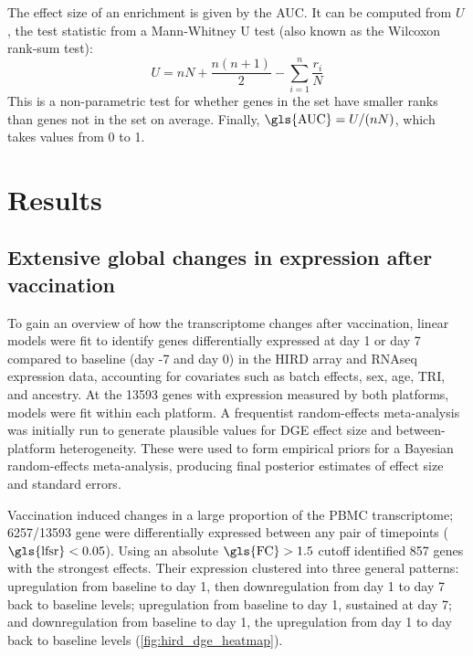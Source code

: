The effect size of an enrichment is given by the \gls{AUC}.
It can be computed from $U$, the test statistic from a Mann-Whitney U test (also known as the Wilcoxon rank-sum test):
\begin{equation}
    U = nN + \frac{n(n + 1)}{2} - \sum_{i=1}^{n} \frac{r_i}{N}
\end{equation}
This is a non-parametric test for whether genes in the set have smaller ranks than genes not in the set on average.
Finally, $\text{\gls{AUC}} = U/(nN)$, which takes values from 0 to 1.

\section{Results}

\subsection{Extensive global changes in expression after vaccination}

To gain an overview of how the transcriptome changes after vaccination, linear models were fit to identify genes differentially expressed at day 1 or day 7 compared to baseline (day -7 and day 0) in the \gls{HIRD} array and \gls{RNAseq} expression data, accounting for covariates such as batch effects, sex, age, \gls{TRI}, and ancestry.
At the \num{13593} genes with expression measured by both platforms, models were fit within each platform.
A frequentist random-effects meta-analysis was initially run to generate plausible values for \gls{DGE} effect size and between-platform heterogeneity.
These were used to form empirical priors for a Bayesian random-effects meta-analysis, producing final posterior estimates of effect size and standard errors.

Vaccination induced changes in a large proportion of the \gls{PBMC} transcriptome; \num{6257/13593} gene were differentially expressed between any pair of timepoints ($\text{\gls{lfsr}} < 0.05$).
Using an absolute $\text{\gls{FC}} > 1.5$ cutoff identified 857 genes with the strongest effects.
Their expression clustered into three general patterns:
    upregulation from baseline to day 1, then downregulation from day 1 to day 7 back to baseline levels;
    upregulation from baseline to day 1, sustained at day 7; 
    and downregulation from baseline to day 1, the upregulation from day 1 to day back to baseline levels (\cref{fig:hird_dge_heatmap}).
%
 
